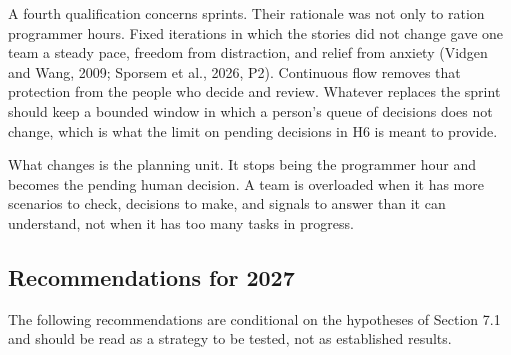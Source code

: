 \documentclass[11pt]{article}
\begin{document}
A fourth qualification concerns sprints. Their rationale was not only to ration programmer hours. Fixed iterations in which the stories did not change gave one team a steady pace, freedom from distraction, and relief from anxiety (Vidgen and Wang, 2009; Sporsem et al., 2026, P2). Continuous flow removes that protection from the people who decide and review. Whatever replaces the sprint should keep a bounded window in which a person's queue of decisions does not change, which is what the limit on pending decisions in H6 is meant to provide.

What changes is the planning unit. It stops being the programmer hour and becomes the pending human decision. A team is overloaded when it has more scenarios to check, decisions to make, and signals to answer than it can understand, not when it has too many tasks in progress.

\subsection{Recommendations for 2027}

The following recommendations are conditional on the hypotheses of Section 7.1 and should be read as a strategy to be tested, not as established results.
\end{document}

